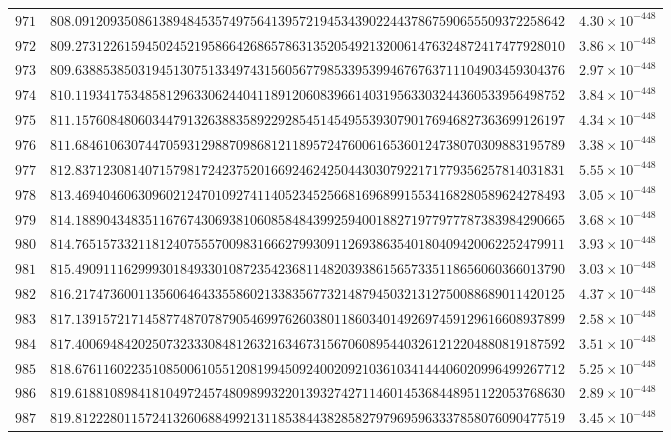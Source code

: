 \documentclass[12pt,reqno]{amsart}
\theoremstyle{remark}
\begin{document}
\begin{longtable}{clc}
$971$ & $808.0912093508613894845357497564139572194534390224437867590655509372258642$ & $4.30\times 10^{-448}$ \\
$972$ & $809.2731226159450245219586642686578631352054921320061476324872417477928010$ & $3.86\times 10^{-448}$ \\
$973$ & $809.6388538503194513075133497431560567798533953994676763711104903459304376$ & $2.97\times 10^{-448}$ \\
$974$ & $810.1193417534858129633062440411891206083966140319563303244360533956498752$ & $3.84\times 10^{-448}$ \\
$975$ & $811.1576084806034479132638835892292854514549553930790176946827363699126197$ & $4.34\times 10^{-448}$ \\
$976$ & $811.6846106307447059312988709868121189572476006165360124738070309883195789$ & $3.38\times 10^{-448}$ \\
$977$ & $812.8371230814071579817242375201669246242504430307922171779356257814031831$ & $5.55\times 10^{-448}$ \\
$978$ & $813.4694046063096021247010927411405234525668169689915534168280589624278493$ & $3.05\times 10^{-448}$ \\
$979$ & $814.1889043483511676743069381060858484399259400188271977977787383984290665$ & $3.68\times 10^{-448}$ \\
$980$ & $814.7651573321181240755570098316662799309112693863540180409420062252479911$ & $3.93\times 10^{-448}$ \\
$981$ & $815.4909111629993018493301087235423681148203938615657335118656060366013790$ & $3.03\times 10^{-448}$ \\
$982$ & $816.2174736001135606464335586021338356773214879450321312750088689011420125$ & $4.37\times 10^{-448}$ \\
$983$ & $817.1391572171458774870787905469976260380118603401492697459129616608937899$ & $2.58\times 10^{-448}$ \\
$984$ & $817.4006948420250732333084812632163467315670608954403261212204880819187592$ & $3.51\times 10^{-448}$ \\
$985$ & $818.6761160223510850061055120819945092400209210361034144406020996499267712$ & $5.25\times 10^{-448}$ \\
$986$ & $819.6188108984181049724574809899322013932742711460145368448951122053768630$ & $2.89\times 10^{-448}$ \\
$987$ & $819.8122280115724132606884992131185384438285827979695963337858076090477519$ & $3.45\times 10^{-448}$ \\

\end{longtable}
\end{document}

